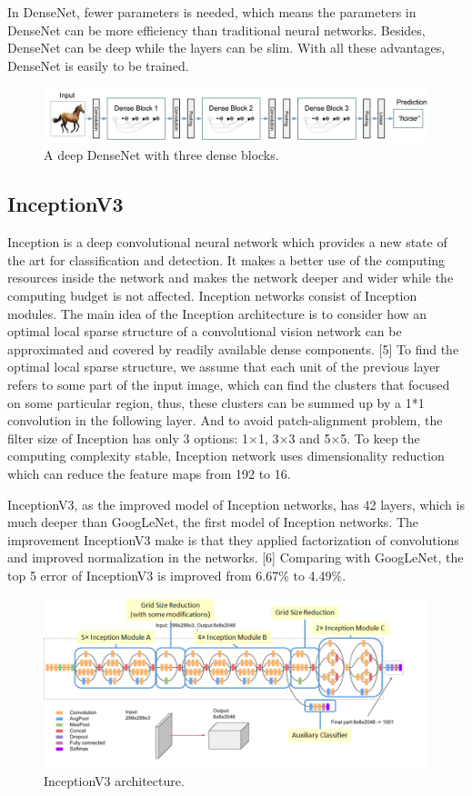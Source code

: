 \documentclass{article}
\begin{document}
In DenseNet, fewer parameters is needed, which means the parameters in DenseNet can be more efficiency than traditional neural networks. Besides, DenseNet can be deep while the layers can be slim. With all these advantages, DenseNet is easily to be trained.

\begin{figure}[H]
	\centering
	\includegraphics[width=0.8\linewidth]{pics/densenet} 
	\caption{A deep DenseNet with three dense blocks.}
\end{figure}

\subsection{InceptionV3}

Inception is a deep convolutional neural network which provides a new state of the art for classification and detection. It makes a better use of the computing resources inside the network and makes the network deeper and wider while the computing budget is not affected. Inception networks consist of Inception modules. The main idea of the Inception architecture is to consider how an optimal local sparse structure of a convolutional vision network can be approximated and covered by readily available dense components. [5] To find the optimal local sparse structure, we assume that each unit of the previous layer refers to some part of the input image, which can find the clusters that focused on some particular region, thus, these clusters can be summed up by a 1*1 convolution in the following layer. And to avoid patch-alignment problem, the filter size of Inception has only 3 options: 1$\times$1, 3$\times$3 and 5$\times$5. To keep the computing complexity stable, Inception network uses dimensionality reduction which can reduce the feature maps from 192 to 16.

InceptionV3, as the improved model of Inception networks, has 42 layers, which is much deeper than GoogLeNet, the first model of Inception networks. The improvement InceptionV3 make is that they applied factorization of convolutions and improved normalization in the networks. [6] Comparing with GoogLeNet, the top 5 error of InceptionV3 is improved from 6.67\% to 4.49\%.

\begin{figure}[H]
	\centering
	\includegraphics[width=0.8\linewidth]{pics/inception} 
	\caption{InceptionV3 architecture.}
\end{figure}
\end{document}
